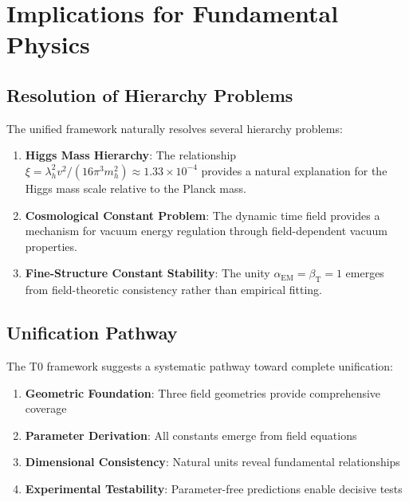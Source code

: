 \documentclass[12pt,a4paper]{article}
\begin{document}
	\section{Implications for Fundamental Physics}
	\label{sec:fundamental_implications}
	
	\subsection{Resolution of Hierarchy Problems}
	\label{subsec:hierarchy_resolution}
	
	The unified framework naturally resolves several hierarchy problems:
	
	\begin{enumerate}
		\item \textbf{Higgs Mass Hierarchy}: The relationship $\xi = \lambda_h^2 v^2/(16\pi^3 m_h^2) \approx 1.33 \times 10^{-4}$ provides a natural explanation for the Higgs mass scale relative to the Planck mass.
		
		\item \textbf{Cosmological Constant Problem}: The dynamic time field provides a mechanism for vacuum energy regulation through field-dependent vacuum properties.
		
		\item \textbf{Fine-Structure Constant Stability}: The unity $\alpha_{\text{EM}} = \beta_{\text{T}} = 1$ emerges from field-theoretic consistency rather than empirical fitting.
	\end{enumerate}
	
	\subsection{Unification Pathway}
	\label{subsec:unification_pathway}
	
	The T0 framework suggests a systematic pathway toward complete unification:
	
	\begin{enumerate}
		\item \textbf{Geometric Foundation}: Three field geometries provide comprehensive coverage
		\item \textbf{Parameter Derivation}: All constants emerge from field equations
		\item \textbf{Dimensional Consistency}: Natural units reveal fundamental relationships
		\item \textbf{Experimental Testability}: Parameter-free predictions enable decisive tests
	\end{enumerate}
	
\end{document}
